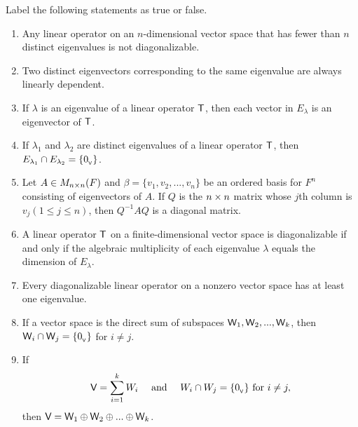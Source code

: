\exercisesection

\begin{exercise} \label{exercise 5.2.1}
Label the following statements as true or false.
\begin{enumerate}
\item Any linear operator on an \(n\)-dimensional vector space that has fewer than \(n\) distinct eigenvalues is not diagonalizable.
\item Two distinct eigenvectors corresponding to the same eigenvalue are always linearly dependent.
\item If \(\lambda\) is an eigenvalue of a linear operator \(\textsf{T}\), then each vector in \(E_{\lambda}\) is an eigenvector of \(\textsf{T}\).
\item If \(\lambda_1\) and \(\lambda_2\) are distinct eigenvalues of a linear operator \(\textsf{T}\), then \(E_{\lambda_1} \cap E_{\lambda_2} = \{ 0_{_{\textsf{V}}} \}\).
\item Let \(A \in M_{n \times n}(F)\) and \(\beta = \{ v_1, v_2, ..., v_n \}\) be an ordered basis for \(F^n\) consisting of eigenvectors of \(A\).
If \(Q\) is the \(n \times n\) matrix whose \(j\)th column is \(v_j (1 \le j \le n)\), then \(Q^{-1} A Q\) is a diagonal matrix.
\item A linear operator \(\textsf{T}\) on a finite-dimensional vector space is diagonalizable if and only if the algebraic multiplicity of each eigenvalue \(\lambda\) equals the dimension of \(E_{\lambda}\).
\item Every diagonalizable linear operator on a nonzero vector space has at least one eigenvalue.
\item If a vector space is the direct sum of subspaces \(\textsf{W}_1, \textsf{W}_2, ..., \textsf{W}_k\), then \(\textsf{W}_i \cap \textsf{W}_j = \{ 0_{_{\textsf{V}}} \}\) for \(i \ne j\).

\item If
\[
    \textsf{V} = \sum_{i = 1}^k W_i \quad \text{ and } \quad W_i \cap W_j = \{ 0_{_{\textsf{V}}} \} \text{ for } i \ne j,
\]
then \(\textsf{V} = \textsf{W}_1 \oplus \textsf{W}_2 \oplus ... \oplus \textsf{W}_k\).
\end{enumerate}
\end{exercise}

